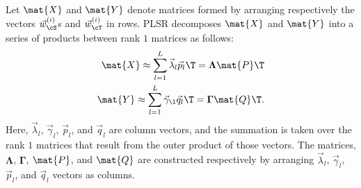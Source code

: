 \documentclass[11pt]{article}
\begin{document}
Let $\mat{X}$ and $\mat{Y}$ denote matrices formed by arranging respectively the vectors $\vec{w}_{\cS}^{(i)}$s and
$\vec{w}_{\cT}^{(i)}$ in rows. PLSR decomposes $\mat{X}$ and $\mat{Y}$ into a series of products 
between rank $1$ matrices as follows:
\begin{eqnarray}
\label{eq:X}
\mat{X} \approx \sum_{l=1}^{L} \vec{\lambda}_{l} \vec{p}_{l}\T = \mathbf{\Lambda} \mat{P}\T \\
\label{eq:Y}
\mat{Y} \approx \sum_{l=1}^{L} \vec{\gamma}_{\l} \vec{q}_{l}\T = \mathbf{\Gamma} \mat{Q}\T. 
\end{eqnarray}
Here, $\vec{\lambda}_{l}$, $\vec{\gamma}_{l}$, $\vec{p}_{l}$, and $\vec{q}_{l}$ are column
vectors, and the summation is taken over the rank $1$ matrices that result from the outer product of 
those vectors. The matrices, $\mathbf{\Lambda}$, $\mathbf{\Gamma}$,  $\mat{P}$, and $\mat{Q}$
are constructed respectively by arranging $\vec{\lambda}_{l}$, $\vec{\gamma}_{l}$, $\vec{p}_{l}$, and $\vec{q}_{l}$ 
vectors as columns.
\end{document}
